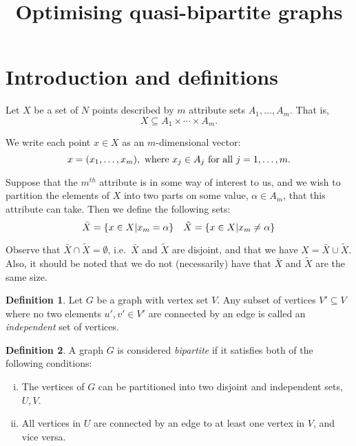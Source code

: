 \documentclass{article}
\title{Optimising quasi-bipartite graphs}
\theoremstyle{definition} \newtheorem{definition}{Definition}
\begin{document}
\maketitle

\section{Introduction and definitions}\label{sec:intro}

Let \(X\) be a set of \(N\) points described by \(m\) attribute sets \(A_1,
\ldots, A_m\). That is,
\[
    X \subseteq A_1 \times \cdots \times A_m.
\]

We write each point \(x \in X\) as an \(m\)-dimensional vector:
\[
    x = (x_1, \ldots, x_m), \ \text{where} \ x_j \in A_j \ \text{for all} \ j = 
    1, \ldots, m.\\
\]

Suppose that the \(m^{th}\) attribute is in some way of interest to us, and we 
wish to partition the elements of \(X\) into two parts on some value, 
\(\alpha \in A_m\), that this attribute can take. Then we define the following 
sets:
\[
    \bar{X} = \{ x \in X | x_m = \alpha \} \quad \tilde{X} = \{ x \in X | x_m 
    \neq \alpha \}\\
\]

Observe that \(\bar{X} \cap \tilde{X} = \emptyset\), i.e.\ \(\bar{X}\) and
\(\tilde{X}\) are disjoint, and that we have \(X = \bar{X} \cup \tilde{X}\). 
Also, it should be noted that we do not (necessarily) have that \(\bar{X}\) and 
\(\tilde{X}\) are the same size.\\

\begin{definition}
    Let \(G\) be a graph with vertex set \(V\). Any subset of vertices \(V' 
    \subseteq V\) where no two elements \(u', v' \in V'\) are connected by an 
    edge is called an \emph{independent} set of vertices.\\
\end{definition}

\begin{definition}
    A graph \(G\) is considered \emph{bipartite} if it satisfies both of the 
    following conditions:
    \begin{enumerate}[(i)]
        \item The vertices of \(G\) can be partitioned into two disjoint and
            independent sets, \(U, V\).
        \item All vertices in \(U\) are connected by an edge to at least one
            vertex in \(V\), and vice versa.\\
    \end{enumerate}
\end{definition}
\end{document}
